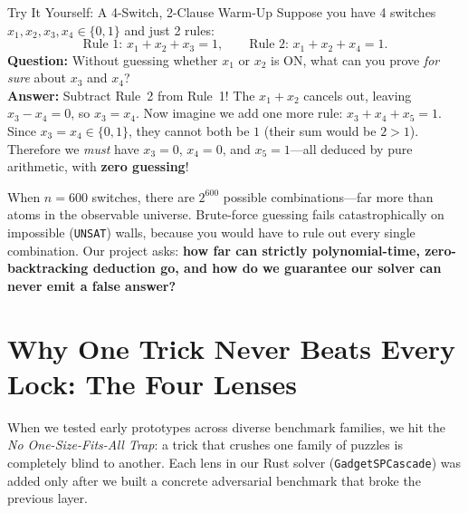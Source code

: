 \documentclass[11pt]{article}
\begin{document}
\begin{intuition}{Try It Yourself: A 4-Switch, 2-Clause Warm-Up}
Suppose you have 4 switches $x_1, x_2, x_3, x_4 \in \{0, 1\}$ and just 2 rules:
\[
\text{Rule 1: } x_1 + x_2 + x_3 = 1, \qquad
\text{Rule 2: } x_1 + x_2 + x_4 = 1.
\]
\textbf{Question:} Without guessing whether $x_1$ or $x_2$ is ON, what can you prove \emph{for sure} about $x_3$ and $x_4$?\\[3pt]
\textbf{Answer:} Subtract Rule~2 from Rule~1! The $x_1 + x_2$ cancels out, leaving $x_3 - x_4 = 0$, so \textbf{$x_3 = x_4$}. Now imagine we add one more rule: $x_3 + x_4 + x_5 = 1$. Since $x_3 = x_4 \in \{0,1\}$, they cannot both be $1$ (their sum would be $2 > 1$). Therefore we \emph{must} have $x_3 = 0$, $x_4 = 0$, and $x_5 = 1$---all deduced by pure arithmetic, with \textbf{zero guessing}!
\end{intuition}

When $n = 600$ switches, there are $2^{600}$ possible combinations---far more than atoms in the observable universe. Brute-force guessing fails catastrophically on impossible (\texttt{UNSAT}) walls, because you would have to rule out every single combination. Our project asks: \textbf{how far can strictly polynomial-time, zero-backtracking deduction go, and how do we guarantee our solver can never emit a false answer?}

\section{Why One Trick Never Beats Every Lock: The Four Lenses}

When we tested early prototypes across diverse benchmark families, we hit the \emph{No One-Size-Fits-All Trap}: a trick that crushes one family of puzzles is completely blind to another. Each lens in our Rust solver (\texttt{GadgetSPCascade}) was added only after we built a concrete adversarial benchmark that broke the previous layer.
\end{document}
